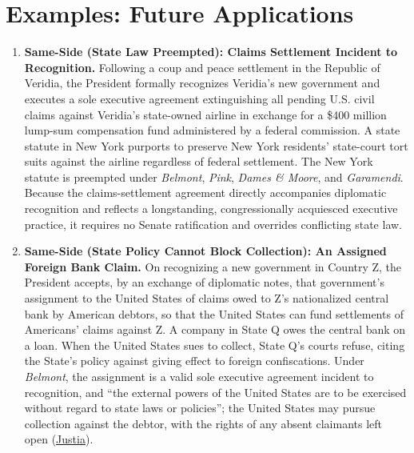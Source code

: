 \documentclass[12pt]{article}
\begin{document}
\section{Examples: Future Applications}
\begin{enumerate}

\item \textbf{Same-Side (State Law Preempted): Claims Settlement Incident to Recognition.} Following a coup and peace settlement in the Republic of Veridia, the President formally recognizes Veridia's new government and executes a sole executive agreement extinguishing all pending U.S. civil claims against Veridia's state-owned airline in exchange for a \$400 million lump-sum compensation fund administered by a federal commission. A state statute in New York purports to preserve New York residents' state-court tort suits against the airline regardless of federal settlement. The New York statute is preempted under \textit{Belmont}, \textit{Pink}, \textit{Dames \& Moore}, and \textit{Garamendi}. Because the claims-settlement agreement directly accompanies diplomatic recognition and reflects a longstanding, congressionally acquiesced executive practice, it requires no Senate ratification and overrides conflicting state law.

\item \textbf{Same-Side (State Policy Cannot Block Collection): An Assigned Foreign Bank Claim.} On recognizing a new government in Country Z, the President accepts, by an exchange of diplomatic notes, that government's assignment to the United States of claims owed to Z's nationalized central bank by American debtors, so that the United States can fund settlements of Americans' claims against Z. A company in State Q owes the central bank on a loan. When the United States sues to collect, State Q's courts refuse, citing the State's policy against giving effect to foreign confiscations. Under \textit{Belmont}, the assignment is a valid sole executive agreement incident to recognition, and ``the external powers of the United States are to be exercised without regard to state laws or policies''; the United States may pursue collection against the debtor, with the rights of any absent claimants left open (\href{https://supreme.justia.com/cases/federal/us/301/324/}{Justia}).


\end{enumerate}
\end{document}
